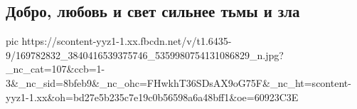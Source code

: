  
 
 
 
 

\subsection{Добро, любовь и свет сильнее тьмы и зла}

\ifcmt
  pic https://scontent-yyz1-1.xx.fbcdn.net/v/t1.6435-9/169782832_3840416539375746_5359980754131086829_n.jpg?_nc_cat=107&ccb=1-3&_nc_sid=8bfeb9&_nc_ohc=FHwkhT36SDsAX9oG75F&_nc_ht=scontent-yyz1-1.xx&oh=bd27e5b235c7e19c0b56598a6a48bff1&oe=60923C3E
\fi

